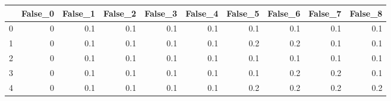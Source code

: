 \begin{tabular}{lrrrrrrrrr}
\toprule
{} &  False\_0 &  False\_1 &  False\_2 &  False\_3 &  False\_4 &  False\_5 &  False\_6 &  False\_7 &  False\_8 \\ \hline
\midrule
0 &        0 &      0.1 &      0.1 &      0.1 &      0.1 &      0.1 &      0.1 &      0.1 &      0.1 \\ \hline
1 &        0 &      0.1 &      0.1 &      0.1 &      0.1 &      0.2 &      0.2 &      0.1 &      0.1 \\ \hline
2 &        0 &      0.1 &      0.1 &      0.1 &      0.1 &      0.1 &      0.1 &      0.1 &      0.1 \\ \hline
3 &        0 &      0.1 &      0.1 &      0.1 &      0.1 &      0.1 &      0.2 &      0.2 &      0.1 \\ \hline
4 &        0 &      0.1 &      0.1 &      0.1 &      0.1 &      0.2 &      0.2 &      0.2 &      0.2 \\ \hline
\bottomrule
\end{tabular}
